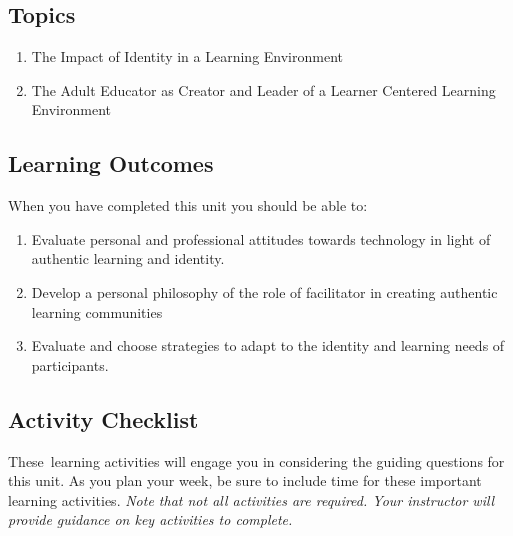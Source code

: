 \documentclass[
]{book}
\providecommand{\tightlist}{%
  \setlength{\itemsep}{0pt}\setlength{\parskip}{0pt}}
\begin{document}
\hypertarget{topics-5}{%
\subsection*{Topics}\label{topics-5}}

\begin{enumerate}
\def\labelenumi{\arabic{enumi}.}
\tightlist
\item
  The Impact of Identity in a Learning Environment\\
\item
  The Adult Educator as Creator and Leader of a Learner Centered Learning Environment
\end{enumerate}

\hypertarget{learning-outcomes-5}{%
\subsection*{Learning Outcomes}\label{learning-outcomes-5}}

When you have completed this unit you should be able to:

\begin{enumerate}
\def\labelenumi{\arabic{enumi}.}
\tightlist
\item
  Evaluate personal and professional attitudes towards technology in light of authentic learning and identity.\\
\item
  Develop a personal philosophy of the role of facilitator in creating authentic learning communities\\
\item
  Evaluate and choose strategies to adapt to the identity and learning needs of participants.
\end{enumerate}

\hypertarget{activity-checklist-5}{%
\subsection*{Activity Checklist}\label{activity-checklist-5}}

These~learning activities will engage you in considering the guiding questions for this unit. As you plan your week, be sure to include time for these important learning activities. \emph{Note that not all activities are required. Your instructor will provide guidance on key activities to complete.}
\end{document}
